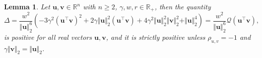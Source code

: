 \documentclass[a4paper, 12pt]{article}
\newcommand{\T}{\top}
\newtheorem{lemma}{Lemma}
\begin{document}
%
%
\begin{lemma}
\label{lemma:Delta_sign}
Let $\boldsymbol{u},\boldsymbol{v} \in \mathbb{R}^n$ with $n\geq 2$, $\gamma, w, r \in \mathbb{R}_+$, then the quantity 
$$
\Delta=\frac{w^2}{\Vert \boldsymbol{u} \Vert_2^6} \left(
-3\gamma^2(\boldsymbol{u}^{\T} \boldsymbol{v})^2 
+ 2\gamma \Vert \boldsymbol{u} \Vert_2^2 (\boldsymbol{u}^{\T} \boldsymbol{v}) 
+ 4\gamma^2 \Vert \boldsymbol{u} \Vert_2^2 \Vert \boldsymbol{v} \Vert_2^2 
+ \Vert \boldsymbol{u} \Vert_2^4 \right)=\frac{w^2}{\Vert \boldsymbol{u} \Vert_2^6}\mathcal{Q}(\boldsymbol{u}^{\T}\boldsymbol{v}),
$$ 
is positive for all real vectors $\boldsymbol{u}, \boldsymbol{v}$, and it is strictly positive unless $\rho_{u,v} = -1$ and $\gamma \Vert \boldsymbol{v} \Vert_2 = \Vert \boldsymbol{u} \Vert_2$. 
\end{lemma}
\end{document}

